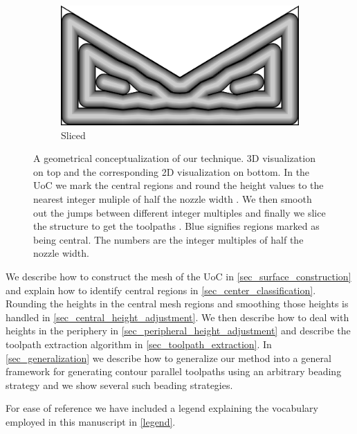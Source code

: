 \begin{figure}
\begin{subfigure}{\figwidth}
\includegraphics[width=\figwidthTwo]{sources/method/surface/sliced_2D.png}
\caption{Sliced}\label{3d_surface_overview_sliced}
\end{subfigure}
\caption{
A geometrical conceptualization of our technique.
3D visualization on top and the corresponding 2D visualization on bottom.
In the UoC 
we mark the central regions 
and round the height values to the nearest integer muliple of half the nozzle width .
We then smooth out the jumps between different integer multiples 
and finally we slice the structure to get the toolpaths .
Blue signifies regions marked as being central.
The numbers are the integer multiples of half the nozzle width.
}
\label{3d_surface_overview}
\end{figure}


We describe how to construct the mesh of the UoC in \cref{sec_surface_construction} and
explain how to identify central regions in \cref{sec_center_classification}.
Rounding the heights in the central mesh regions and smoothing those heights is handled in \cref{sec_central_height_adjustment}.
We then describe how to deal with heights in the periphery in \cref{sec_peripheral_height_adjustment}
and describe the toolpath extraction algorithm in \cref{sec_toolpath_extraction}.
In \cref{sec_generalization} we describe how to generalize our method into a general framework for generating contour parallel toolpaths using an arbitrary beading strategy and we show several such beading strategies.


For ease of reference we have included a legend explaining the vocabulary employed in this manuscript in \cref{legend}.

